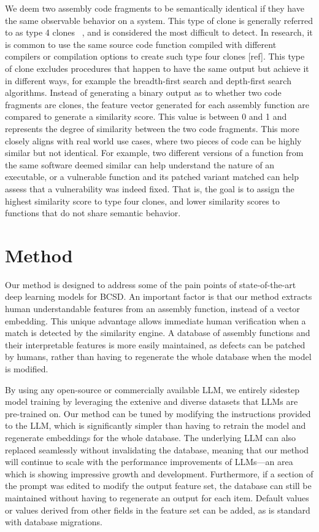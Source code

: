 \documentclass[conference,compsoc]{IEEEtran}
\begin{document}
We deem two assembly code fragments to be semantically identical if they have the same observable behavior on a system.
This type of clone is generally referred to as type 4 clones ~\cite{Asm2Vec,BinClone}, and is considered the most difficult
to detect. In research, it is common to use the same source code function compiled with different compilers or compilation
options to create such type four clones [ref]. This type of clone excludes procedures that happen to have the same output but
achieve it in different ways, for example the breadth-first search and depth-first search algorithms. Instead of generating a
binary output as to whether two code fragments are clones, the feature vector generated for each assembly function are
compared to generate a similarity score. This value is between 0 and 1 and represents the degree of similarity
between the two code fragments. This more closely aligns with real world use cases, where two pieces of code can be highly similar
but not identical. For example, two different versions of a function from the same software deemed similar can
help understand the nature of an executable, or a vulnerable function and its patched variant matched can help assess that
a vulnerability was indeed fixed. That is, the goal is to assign the highest similarity score to type four clones, and
lower similarity scores to functions that do not share semantic behavior.

\section{Method}

Our method is designed to address some of the pain points of state-of-the-art deep learning models for BCSD.
An important factor is that our method extracts human understandable features from an assembly function, instead
of a vector embedding. This unique advantage allows immediate human verification when a match is detected by the similarity
engine. A database of assembly functions and their interpretable features is more easily maintained, as defects can
be patched by humans, rather than having to regenerate the whole database when the model is modified.

By using any open-source or commercially available LLM, we entirely sidestep model training by leveraging the extenive
and diverse datasets that LLMs are pre-trained on.  Our method can be tuned by modifying the instructions provided to
the LLM, which is significantly simpler than having to retrain the model and regenerate embeddings for the whole database.
The underlying LLM can also replaced seamlessly without invalidating the database, meaning that our method will continue
to scale with the performance improvements of LLMs---an area which is showing impressive growth and development. Furthermore, if
a section of the prompt was edited to modify the output feature set, the database can still be maintained without
having to regenerate an output for each item. Default values or values derived from other fields in the feature set can be added,
as is standard with database migrations.
\end{document}
